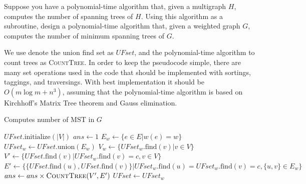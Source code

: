 \documentclass[11pt,a4paper,oneside]{article}
\begin{document}
\begin{problem}{5}
\statement
Suppose you have a polynomial-time algorithm that, given a multigraph $H$,
computes the number of spanning trees of $H$.
Using this algorithm as a subroutine, design a polynomial-time algorithm
that, given a weighted graph $G$, computes the number of 
minimum spanning trees of $G$.

\solution

We use denote the union find set as $UFset$, and the polynomial­-time algorithm to count trees as \textsc{CountTree}. In order to keep the pseudocode simple, there are many set operations used in the code that should be implemented with sortings, taggings, and traversings. With best implementation it should be $O(m \log m + n ^ 3)$, assuming that the polynomial­-time algorithm is based on Kirchhoff's Matrix Tree theorem and Gauss elimination.

\begin{algorithm}
	\caption{Computes number of MST in $G$}
	\begin{algorithmic}[1]
		\State $UFset.\text{initialize}(|V|)$
		\State $ans \gets 1$
		\State $E_w \gets \big\{e \in E \big| w(e) = w\big\}$
		\State $UFset_w \gets UFset.\text{union}(E_w)$
		\State $V_w \gets \big\{UFset_w.\text{find}(v) \big| v \in V \big\}$
				\State $V' \gets \big\{UFset.\text{find}(v) \big| UFset_w.\text{find}(v) = c, v \in V\big\}$
				\State $E' \gets \big\{ \{UFset.\text{find}(u), UFset.\text{find}(v)\} \big| UFset_w.\text{find}(u) = UFset_w.\text{find}(v) = c, \{u, v\} \in E_w\big\}$
				\State $ans \gets ans \times \textsc{CountTree}(V', E')$
			\EndFor
		\State $UFset \gets UFset_w$
		\EndFor
		\EndProcedure
	\end{algorithmic}
\end{algorithm}


\end{problem}
\end{document}
